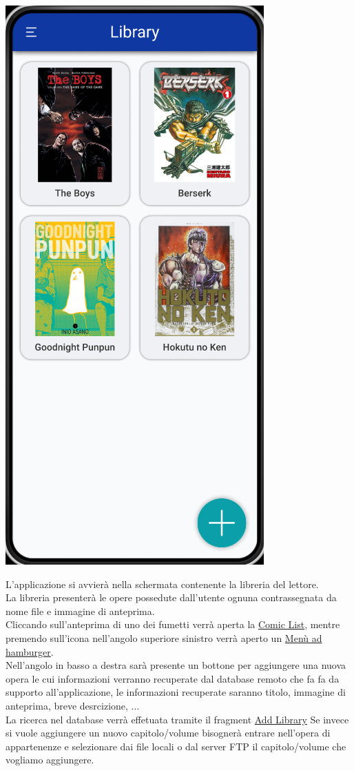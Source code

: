 \documentclass{report}
\begin{document}
\begin{center}
   \includegraphics[scale=0.4]{library_home_page.png}
\end{center}

L'applicazione si avvierà nella schermata contenente la libreria del lettore.\\
La libreria presenterà le opere possedute dall'utente ognuna contrassegnata da nome file e immagine di anteprima.\\
Cliccando sull'anteprima di uno dei fumetti verrà aperta la \hyperref[sec:comic_list]{Comic List}, mentre premendo sull'icona nell'angolo superiore sinistro verrà aperto un \hyperref[sec:hamburger]{Menù ad hamburger}.\\
Nell'angolo in basso a destra sarà presente un bottone per aggiungere una nuova opera le cui informazioni verranno recuperate dal database remoto che fa fa da supporto all'applicazione, le informazioni recuperate saranno titolo, immagine di anteprima, breve desrcizione, $\dots$\\
La ricerca nel database verrà effetuata tramite il fragment \hyperref[sec:add_library]{Add Library}
Se invece si vuole aggiungere un nuovo capitolo/volume bisognerà entrare nell'opera di appartenenze e selezionare dai file locali o dal server FTP il capitolo/volume che vogliamo aggiungere.
\end{document}
